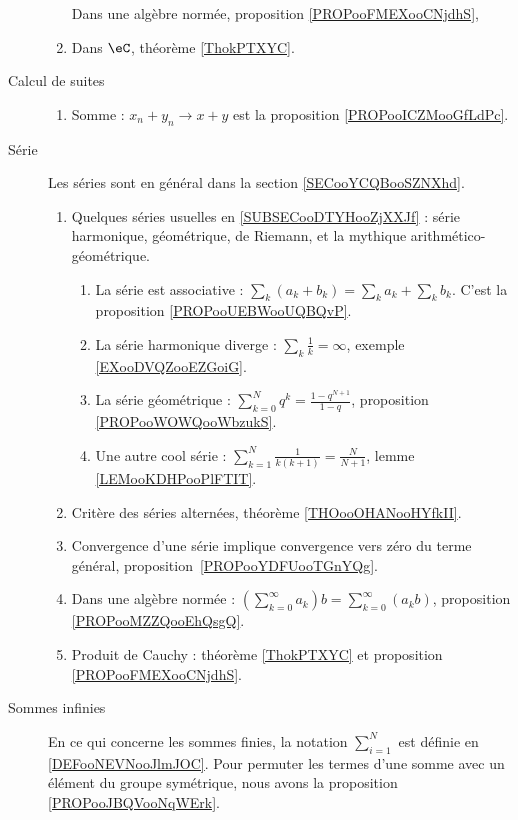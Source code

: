 \begin{description}
\begin{enumerate}
                Dans une algèbre normée, proposition \ref{PROPooFMEXooCNjdhS},
            \item
                Dans \( \eC\), théorème \ref{ThokPTXYC}.
        \end{enumerate}
    \item[Calcul de suites]
        \begin{enumerate}
            \item
                Somme : \( x_n+y_n\to x+y\) est la proposition \ref{PROPooICZMooGfLdPc}.
        \end{enumerate}
    \item[Série] 
        Les séries sont en général dans la section \ref{SECooYCQBooSZNXhd}.
        \begin{enumerate}
    \item
        Quelques séries usuelles en \ref{SUBSECooDTYHooZjXXJf} : série harmonique, géométrique, de Riemann, et la mythique arithmético-géométrique.
        \begin{enumerate}
            \item
                La série est associative : \( \sum_k(a_k+b_k)=\sum_ka_k+\sum_kb_k\). C'est la proposition \ref{PROPooUEBWooUQBQvP}.
            \item
                La série harmonique diverge : \( \sum_k\frac{1}{ k }=\infty\), exemple \ref{EXooDVQZooEZGoiG}.
            \item
                La série géométrique : \( \sum_{k=0}^Nq^k=\frac{ 1-q^{N+1} }{ 1-q }\), proposition \ref{PROPooWOWQooWbzukS}.
            \item
                Une autre cool série : \( \sum_{k=1}^N\frac{ 1 }{ k(k+1) }=\frac{ N }{ N+1 }\), lemme \ref{LEMooKDHPooPlFTIT}.
        \end{enumerate}
    \item
        Critère des séries alternées, théorème \ref{THOooOHANooHYfkII}.
    \item
        Convergence d'une série implique convergence vers zéro du terme général, proposition~\ref{PROPooYDFUooTGnYQg}.
    \item
        Dans une algèbre normée : \( (\sum_{k=0}^{\infty}a_k)b=\sum_{k=0}^{\infty}(a_kb)\), proposition \ref{PROPooMZZQooEhQsgQ}.
    \item
        Produit de Cauchy : théorème \ref{ThokPTXYC} et proposition \ref{PROPooFMEXooCNjdhS}.
        \end{enumerate}

    \item[Sommes infinies]
        En ce qui concerne les sommes finies, la notation \( \sum_{i=1}^N\) est définie en \ref{DEFooNEVNooJlmJOC}. Pour permuter les termes d'une somme avec un élément du groupe symétrique, nous avons la proposition \ref{PROPooJBQVooNqWErk}.


\end{description}
